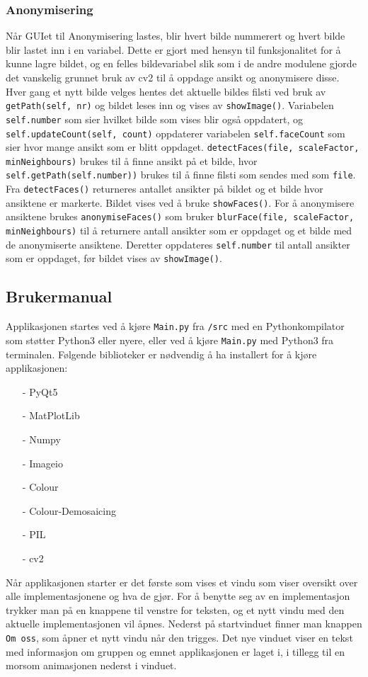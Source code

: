 \subsubsection{Anonymisering}
Når GUIet til Anonymisering lastes, blir hvert bilde nummerert og hvert bilde blir lastet inn i en variabel. Dette er gjort med hensyn til funksjonalitet for å kunne lagre bildet, og en felles bildevariabel slik som i de andre modulene gjorde det vanskelig grunnet bruk av cv2 til å oppdage ansikt og anonymisere disse. Hver gang et nytt bilde velges hentes det aktuelle bildes filsti ved bruk av \texttt{getPath(self, nr)} og bildet leses inn og vises av \texttt{showImage()}. Variabelen \texttt{self.number} som sier hvilket bilde som vises blir også oppdatert, og \texttt{self.updateCount(self, count)} oppdaterer variabelen \texttt{self.faceCount} som sier hvor mange ansikt som er blitt oppdaget. \texttt{detectFaces(file, scaleFactor, minNeighbours)} brukes til å finne ansikt på et bilde, hvor \texttt{self.getPath(self.number))} brukes til å finne filsti som sendes med som \texttt{file}. Fra \texttt{detectFaces()} returneres antallet ansikter på bildet og et bilde hvor ansiktene er markerte. Bildet vises ved å bruke \texttt{showFaces()}. For å anonymisere ansiktene brukes \texttt{anonymiseFaces()} som bruker \texttt{blurFace(file, scaleFactor, minNeighbours)} til å returnere antall ansikter som er oppdaget og et bilde med de anonymiserte ansiktene. Deretter oppdateres \texttt{self.number} til antall ansikter som er oppdaget, før bildet vises av \texttt{showImage()}.

\subsection{Brukermanual}
Applikasjonen startes ved å kjøre \texttt{Main.py} fra \texttt{/src} med en Pythonkompilator som støtter Python3 eller nyere, eller ved å kjøre \texttt{Main.py} med Python3 fra terminalen. Følgende biblioteker er nødvendig å ha installert for å kjøre applikasjonen:
\begin{itemize}[noitemsep,topsep=0pt,parsep=0pt,partopsep=0pt]
  \item[-] PyQt5
  \item[-] MatPlotLib
  \item[-] Numpy
  \item[-] Imageio
  \item[-] Colour
  \item[-] Colour-Demosaicing
  \item[-] PIL
  \item[-] cv2
\end{itemize}
Når applikasjonen starter er det første som vises et vindu som viser oversikt over alle implementasjonene og hva de gjør. For å benytte seg av en implementasjon trykker man på en knappene til venstre for teksten, og et nytt vindu med den aktuelle implementasjonen vil åpnes. Nederst på startvinduet finner man knappen \texttt{Om oss}, som åpner et nytt vindu når den trigges. Det nye vinduet viser en tekst med informasjon om gruppen og emnet applikasjonen er laget i, i tillegg til en morsom animasjonen nederst i vinduet. 

